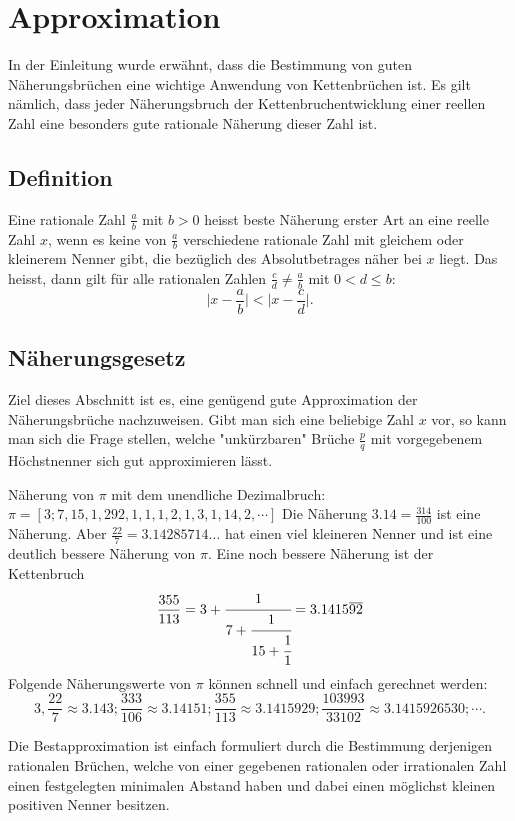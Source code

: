 %
%
%
\section{Approximation
\label{kettenbruch:section:Approximation}}

In der Einleitung wurde erwähnt, dass die Bestimmung von guten
Näherungsbrüchen eine wichtige Anwendung von Kettenbrüchen ist. Es
gilt nämlich, dass jeder Näherungsbruch der Kettenbruchentwicklung
einer reellen Zahl eine besonders gute rationale Näherung dieser
Zahl ist.

\subsection{Definition}

Eine rationale Zahl $\frac{a}{b}$ mit $b>0$ heisst beste Näherung
erster Art an eine reelle Zahl $x$, wenn es keine von $\frac{a}{b}$
verschiedene rationale Zahl mit gleichem oder kleinerem Nenner gibt,
die bezüglich des Absolutbetrages näher bei $x$ liegt.
Das heisst, dann gilt für alle rationalen Zahlen $\frac{c}{d} \ne
\frac{a}{b}$ mit $0<d\le b$:
\begin{equation}
\biggl|x-\frac{a}{b}\biggr| < \biggl| x-\frac{c}{d}\biggr|.
\end{equation}

\subsection{Näherungsgesetz}
Ziel dieses Abschnitt ist es, eine genügend gute Approximation der
Näherungsbrüche nachzuweisen. Gibt man sich eine beliebige Zahl $x$
vor, so kann man sich die Frage stellen, welche "unkürzbaren" Brüche
$\frac{p}{q}$ mit vorgegebenem Höchstnenner sich gut approximieren
lässt.

\begin{beispiel}
Näherung von $\pi$ mit dem unendliche Dezimalbruch:
$\pi = [3;7,15,1,292,1,1,1,2,1,3,1,14,2,\cdots]$
Die Näherung $3.14 = \frac{314}{100}$ ist eine Näherung. Aber
$\frac{22}{7} = 3.14285714\dots$ hat einen viel kleineren Nenner und
ist eine deutlich bessere Näherung von $\pi$.
Eine noch bessere Näherung ist der Kettenbruch
\begin{equation}
\frac{355}{113} = 3 + \cfrac{1}{7+\cfrac{1}{15+\cfrac{1}{1}}} = 3.1415\overline{92}
\end{equation}
Folgende Näherungswerte von $\pi$ können schnell und einfach gerechnet werden:
\begin{equation}
3,\frac{22}{7} \approx 3.143 ; \frac{333}{106} \approx 3.14151 ; \frac{355}{113} 
\approx 3.1415929 ; \frac{103993}{33102} \approx 3.1415926530 ; \cdots.
\end{equation}
\end{beispiel}
Die Bestapproximation ist einfach formuliert durch die Bestimmung
derjenigen rationalen Brüchen, welche von einer gegebenen rationalen
oder irrationalen Zahl einen festgelegten minimalen Abstand haben
und dabei einen möglichst kleinen positiven Nenner besitzen.\cite{kettenbruch:numerical-analysis}

